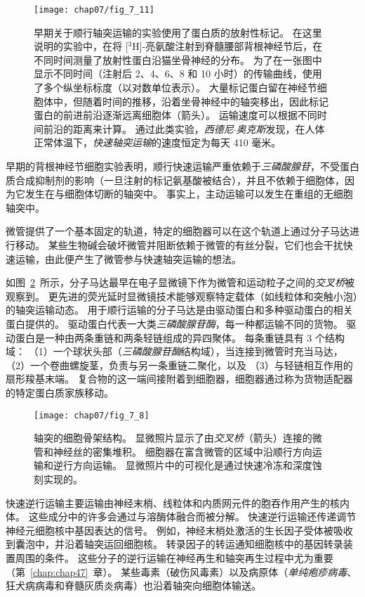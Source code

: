 \begin{figure}[htbp]
	\centering
	\texttt{[image: chap07/fig\_7\_11]}
	\caption{早期关于顺行轴突运输的实验使用了蛋白质的放射性标记。
		在这里说明的实验中，在将 [$^3$H]-亮氨酸注射到脊髓腰部背根神经节后，在不同时间测量了放射性蛋白沿猫坐骨神经的分布。
		为了在一张图中显示不同时间（注射后 2、4、6、8 和 10 小时）的传输曲线，使用了多个纵坐标标度（以对数单位表示）。
		大量标记蛋白留在神经节细胞体中，但随着时间的推移，沿着坐骨神经中的轴突移出，因此标记蛋白的前进前沿逐渐远离细胞体（箭头）。
		运输速度可以根据不同时间前沿的距离来计算。
		通过此类实验，\textit{西德尼$\cdot$奥克斯}发现，在人体正常体温下，\textit{快速轴突运输}的速度恒定为每天 410 毫米\cite{ochs1972fast}。}
	\label{fig:7_11}
\end{figure}


早期的背根神经节细胞实验表明，顺行快速运输严重依赖于\textit{三磷酸腺苷}，不受蛋白质合成抑制剂的影响（一旦注射的标记氨基酸被结合），并且不依赖于细胞体，因为它发生在与细胞体切断的轴突中。
事实上，主动运输可以发生在重组的无细胞轴突中。


微管提供了一个基本固定的轨道，特定的细胞器可以在这个轨道上通过分子马达进行移动。
某些生物碱会破坏微管并阻断依赖于微管的有丝分裂，它们也会干扰快速运输，由此便产生了微管参与快速轴突运输的想法。


如图~\ref{fig:7_8}~所示，分子马达最早在电子显微镜下作为微管和运动粒子之间的\textit{交叉桥}被观察到。
更先进的荧光延时显微镜技术能够观察特定载体（如线粒体和突触小泡）的轴突运输动态。
用于顺行运输的分子马达是由驱动蛋白和多种驱动蛋白的相关蛋白提供的。
驱动蛋白代表一大类\textit{三磷酸腺苷酶}，每一种都运输不同的货物。
驱动蛋白是一种由两条重链和两条轻链组成的异四聚体。
每条重链具有 3 个结构域：
（1）一个球状头部（\textit{三磷酸腺苷酶}结构域），当连接到微管时充当马达，
（2）一个卷曲螺旋茎，负责与另一条重链二聚化，以及
（3）与轻链相互作用的扇形羧基末端。
复合物的这一端间接附着到细胞器，细胞器通过称为货物适配器的特定蛋白质家族移动。


\begin{figure}[htbp]
	\centering
	\texttt{[image: chap07/fig\_7\_8]}
	\caption{轴突的细胞骨架结构。
		显微照片显示了由\textit{交叉桥}（箭头）连接的微管和神经丝的密集堆积。
		细胞器在富含微管的区域中沿顺行方向运输和逆行方向运输。
		显微照片中的可视化是通过快速冷冻和深度蚀刻实现的\cite{schnapp1982cytoplasmic}。}
	\label{fig:7_8}
\end{figure}


快速逆行运输主要运输由神经末梢、线粒体和内质网元件的胞吞作用产生的核内体。
这些成分中的许多会通过与溶酶体融合而被分解。
快速逆行运输还传递调节神经元细胞核中基因表达的信号。
例如，神经末梢处激活的生长因子受体被吸收到囊泡中，并沿着轴突运回细胞核。
转录因子的转运通知细胞核中的基因转录装置周围的条件。
这些分子的逆行运输在神经再生和轴突再生过程中尤为重要（第~\ref{chap:chap47}~章）。 
某些毒素（破伤风毒素）以及病原体（\textit{单纯疱疹病毒}、狂犬病病毒和脊髓灰质炎病毒）也沿着轴突向细胞体输送。


